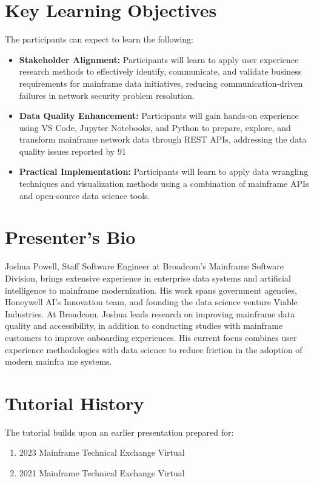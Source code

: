 \documentclass[a4paper]{article}
\begin{document}
\section{Key Learning Objectives}
The participants can expect to learn the following:
\begin{itemize}
    \item \textbf{Stakeholder Alignment:} Participants will learn to apply user experience research methods to effectively identify, communicate, and validate business requirements for mainframe data initiatives, reducing communication-driven failures in network security problem resolution.
    \item \textbf{Data Quality Enhancement:} Participants will gain hands-on experience using VS Code, Jupyter Notebooks, and Python to prepare, explore, and transform mainframe network data through REST APIs, addressing the data quality issues reported by 91%
    \item \textbf{Practical Implementation:} Participants will learn to apply data wrangling techniques and visualization methods using a combination of mainframe APIs and open-source data science tools.
\end{itemize}

\section{Presenter's Bio}
Joshua Powell, Staff Software Engineer at Broadcom's Mainframe Software Division, brings extensive experience in enterprise data systems and artificial intelligence to mainframe modernization. His work spans government agencies, Honeywell AI's Innovation team, and founding the data science venture Viable Industries. At Broadcom, Joshua leads research on improving mainframe data quality and accessibility, in addition to conducting studies with mainframe customers to improve onboarding experiences. His current focus combines user experience methodologies with data science to reduce friction in the adoption of modern mainfra me systems.

\section{Tutorial History}
    The tutorial builds upon an earlier presentation prepared for:
    \begin{enumerate}
        \item 2023 Mainframe Technical Exchange Virtual
        \item 2021 Mainframe Technical Exchange Virtual
    \end{enumerate}
\end{document}
